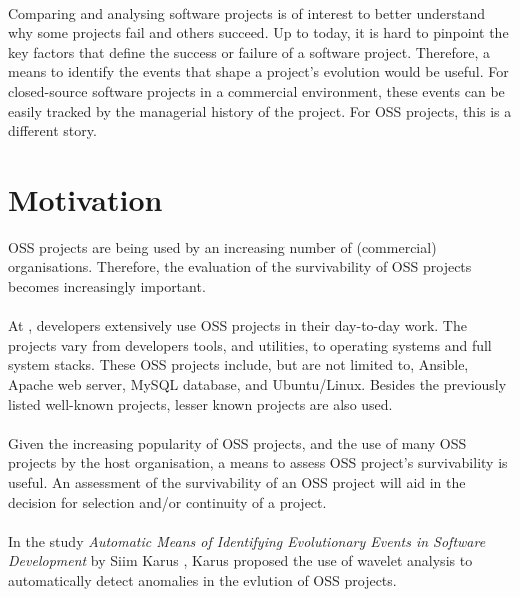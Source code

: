 \paragraph{}
Comparing and analysing software projects is of interest to better understand
why some projects fail and others succeed. Up to today, it is hard to pinpoint
the key factors that define the success or failure of a software project.
Therefore, a means to identify the events that shape a project's evolution would
be useful. For closed-source software projects in a commercial environment,
these events can be easily tracked by the managerial history of the project. For
OSS projects, this is a different story.



\section{Motivation}
OSS projects are being used by an increasing number of (commercial)
organisations. Therefore, the evaluation of the survivability of OSS projects
becomes increasingly important.

\paragraph{}
At \hostOrg, developers extensively use OSS projects in their day-to-day
work. The projects vary from developers tools, and utilities, to operating
systems and full system stacks. These OSS projects include, but are not limited
to, Ansible, Apache web server, MySQL database, and Ubuntu/Linux. Besides the
previously listed well-known projects, lesser known projects are also used.

\paragraph{}
Given the increasing popularity of OSS projects, and the use of many OSS
projects by the host organisation, a means to assess OSS project's
survivability is useful. An assessment of the survivability of an OSS project
will aid in the decision for selection and/or continuity of a project.

\paragraph{}
In the study \emph{Automatic Means of Identifying Evolutionary Events in
Software Development }\rm by Siim Karus \cite{karus2013}, Karus proposed the
use of wavelet analysis to automatically detect anomalies in the evlution of
OSS projects.

